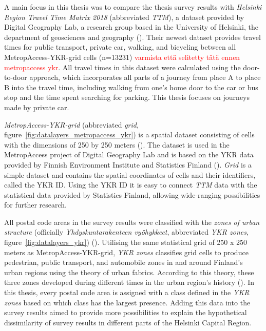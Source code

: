 A main focus in this thesis was to compare the thesis survey results with \textit{Helsinki Region Travel Time Matrix 2018} (abbreviated \textit{TTM}), a dataset provided by Digital Geography Lab, a research group based in the University of Helsinki, the department of geosciences and geography (\cite{Tenkanen2018}). Their newest dataset provides travel times for public transport, private car, walking, and bicycling between all MetropAccess-YKR-grid cells (n=13231) \textcolor{red}{varmista että selitetty tätä ennen metropaccess ykr}. All travel times in this dataset were calculated using the door-to-door approach, which incorporates all parts of a journey from place A to place B into the travel time, including walking from one's home door to the car or bus stop and the time spent searching for parking. This thesis focuses on journeys made by private car.

\textit{MetropAccess-YKR-grid} (abbreviated \textit{grid}, figure~\ref{fig:datalayers_metropaccess_ykr}) is a spatial dataset consisting of cells with the dimensions of 250 by 250 meters (\cite{Toivonen2014a}). The dataset is used in the MetropAccess project of Digital Geography Lab and is based on the YKR data provided by Finnish Environment Institute and Statistics Finland (\cite{StatisticsFinland2020}). \textit{Grid} is a simple dataset and contains the spatial coordinates of cells and their identifiers, called the YKR ID. Using the YKR ID it is easy to connect \textit{TTM} data with the statistical data provided by Statistics Finland, allowing wide-ranging possibilities for further research.

All postal code areas in the survey results were classified with the \textit{zones of urban structure} (officially \textit{Yhdyskuntarakenteen vyöhykkeet}, abbreviated \textit{YKR zones}, figure~\ref{fig:datalayers_ykr}) (\cite{Ristimaki2017}). Utilising the same statistical grid of 250 x 250 meters as MetropAccess-YKR-grid, \textit{YKR zones} classifies grid cells to produce pedestrian, public transport, and automobile zones in and around Finland's urban regions using the theory of urban fabrics. According to this theory, these three zones developed during different times in the urban region's history (\cite{Newman2016}). In this thesis, every postal code area is assigned with a class defined in the \textit{YKR zones} based on which class has the largest presence. Adding this data into the survey results aimed to provide more possibilities to explain the hypothetical dissimilarity of survey results in different parts of the Helsinki Capital Region.

